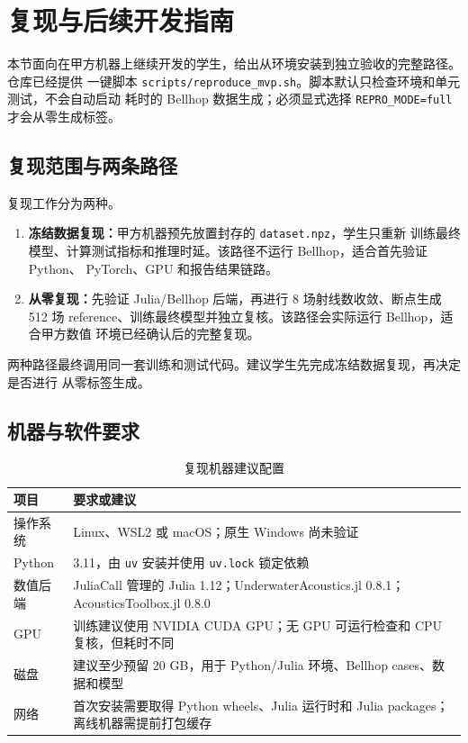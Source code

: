 \documentclass[UTF8,11pt]{ctexart}
\begin{document}
\section{复现与后续开发指南}

本节面向在甲方机器上继续开发的学生，给出从环境安装到独立验收的完整路径。仓库已经提供
一键脚本 \texttt{scripts/reproduce\_mvp.sh}。脚本默认只检查环境和单元测试，不会自动启动
耗时的 Bellhop 数据生成；必须显式选择 \texttt{REPRO\_MODE=full} 才会从零生成标签。

\subsection{复现范围与两条路径}

复现工作分为两种。

\begin{enumerate}
  \item \textbf{冻结数据复现：}甲方机器预先放置封存的 \texttt{dataset.npz}，学生只重新
  训练最终模型、计算测试指标和推理时延。该路径不运行 Bellhop，适合首先验证 Python、
  PyTorch、GPU 和报告结果链路。
  \item \textbf{从零复现：}先验证 Julia/Bellhop 后端，再进行 8 场射线数收敛、断点生成
  512 场 reference、训练最终模型并独立复核。该路径会实际运行 Bellhop，适合甲方数值
  环境已经确认后的完整复现。
\end{enumerate}

两种路径最终调用同一套训练和测试代码。建议学生先完成冻结数据复现，再决定是否进行
从零标签生成。

\subsection{机器与软件要求}

\begin{table}[H]
\centering
\caption{复现机器建议配置}
\begin{tabularx}{\textwidth}{L{3.6cm}Y}
\toprule
项目 & 要求或建议 \\
\midrule
操作系统 & Linux、WSL2 或 macOS；原生 Windows 尚未验证 \\
Python & 3.11，由 \texttt{uv} 安装并使用 \texttt{uv.lock} 锁定依赖 \\
数值后端 & JuliaCall 管理的 Julia 1.12；UnderwaterAcoustics.jl 0.8.1；AcousticsToolbox.jl 0.8.0 \\
GPU & 训练建议使用 NVIDIA CUDA GPU；无 GPU 可运行检查和 CPU 复核，但耗时不同 \\
磁盘 & 建议至少预留 20 GB，用于 Python/Julia 环境、Bellhop cases、数据和模型 \\
网络 & 首次安装需要取得 Python wheels、Julia 运行时和 Julia packages；离线机器需提前打包缓存 \\
\bottomrule
\end{tabularx}
\end{table}
\end{document}
